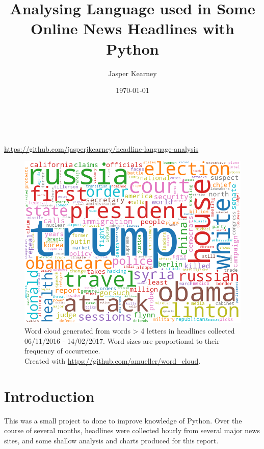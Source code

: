 \documentclass[a4paper,12pt]{article}
\title{Analysing Language used in Some Online News Headlines with Python}
\author{Jasper Kearney}
\date{\today}
\begin{document}
\makeatletter
\begin{titlepage}
    \begin{center}
        \vfill
        \huge \textbf{\@title} \\
        \vspace{1cm}
        \large \@author \\
        \vspace{1cm}
        \small \url{https://github.com/jasperjkearney/headline-language-analysis} \\
        
        \begin{figure}[h]
            \centering
            \includegraphics[width=\linewidth]{word_cloud.png}
            \caption{Word cloud generated from words > 4 letters in headlines collected 06/11/2016 - 14/02/2017. Word sizes are proportional to their frequency of occurrence.\\ Created with \url{https://github.com/amueller/word_cloud}.}
        \end{figure}
    \end{center}
\end{titlepage}
\makeatother

\section{Introduction}
This was a small project to done to improve knowledge of Python. Over the course of several months, headlines were collected hourly from several major news sites, and some shallow analysis and charts produced for this report.
\end{document}

